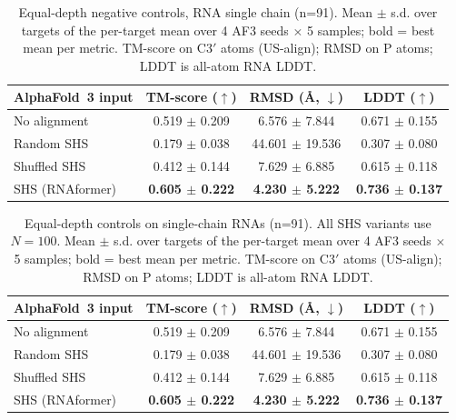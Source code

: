 \begin{table}[htbp]
\centering
\caption{Equal-depth negative controls, RNA single chain (n=91). Mean $\pm$ s.d. over targets of the per-target mean over 4 AF3 seeds $\times$ 5 samples; bold = best mean per metric. TM-score on C3$'$ atoms (US-align); RMSD on P atoms; LDDT is all-atom RNA LDDT.}
\label{tab:rna_single_chain_shuffle}
\begin{tabular}{lccc}
\toprule
AlphaFold~3 input & TM-score ($\uparrow$) & RMSD (\AA, $\downarrow$) & LDDT ($\uparrow$) \\
\midrule
No alignment & 0.519 $\pm$ 0.209 & 6.576 $\pm$ 7.844 & 0.671 $\pm$ 0.155 \\
Random SHS & 0.179 $\pm$ 0.038 & 44.601 $\pm$ 19.536 & 0.307 $\pm$ 0.080 \\
Shuffled SHS & 0.412 $\pm$ 0.144 & 7.629 $\pm$ 6.885 & 0.615 $\pm$ 0.118 \\
SHS (RNAformer) & \textbf{0.605 $\pm$ 0.222} & \textbf{4.230 $\pm$ 5.222} & \textbf{0.736 $\pm$ 0.137} \\
\bottomrule
\end{tabular}
\end{table}

\begin{table}[htbp]
\centering
\caption{Equal-depth controls on single-chain RNAs (n=91). All SHS variants use $N{=}100$. Mean $\pm$ s.d. over targets of the per-target mean over 4 AF3 seeds $\times$ 5 samples; bold = best mean per metric. TM-score on C3$'$ atoms (US-align); RMSD on P atoms; LDDT is all-atom RNA LDDT.}
\label{tab:rna_single_chain_controls}
\begin{tabular}{lccc}
\toprule
AlphaFold~3 input & TM-score ($\uparrow$) & RMSD (\AA, $\downarrow$) & LDDT ($\uparrow$) \\
\midrule
No alignment & 0.519 $\pm$ 0.209 & 6.576 $\pm$ 7.844 & 0.671 $\pm$ 0.155 \\
Random SHS & 0.179 $\pm$ 0.038 & 44.601 $\pm$ 19.536 & 0.307 $\pm$ 0.080 \\
Shuffled SHS & 0.412 $\pm$ 0.144 & 7.629 $\pm$ 6.885 & 0.615 $\pm$ 0.118 \\
SHS (RNAformer) & \textbf{0.605 $\pm$ 0.222} & \textbf{4.230 $\pm$ 5.222} & \textbf{0.736 $\pm$ 0.137} \\
\bottomrule
\end{tabular}
\end{table}


